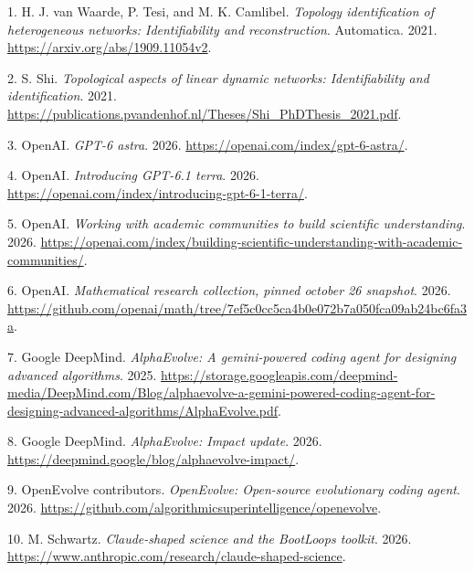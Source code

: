 \documentclass[
  11pt,
]{article}
\newlength{\cslhangindent}
\newlength{\cslentryspacingunit} %
\newenvironment{CSLReferences}[2] %
 {%
  \setlength{\parindent}{0pt}
  \ifodd #1
  \let\oldpar\par
  \def\par{\hangindent=\cslhangindent\oldpar}
  \fi
  \setlength{\parskip}{#2\cslentryspacingunit}
 }%
 {}
\begin{document}
\hypertarget{refs}{}
\begin{CSLReferences}{1}{1}
\leavevmode{}%
1. H. J. van Waarde, P. Tesi, and M. K. Camlibel. \emph{Topology
identification of heterogeneous networks: Identifiability and
reconstruction}. Automatica. 2021.
\url{https://arxiv.org/abs/1909.11054v2}.

\leavevmode{}%
2. S. Shi. \emph{Topological aspects of linear dynamic networks:
Identifiability and identification}. 2021.
\url{https://publications.pvandenhof.nl/Theses/Shi_PhDThesis_2021.pdf}.

\leavevmode{}%
3. OpenAI. \emph{GPT-6 astra}. 2026.
\url{https://openai.com/index/gpt-6-astra/}.

\leavevmode{}%
4. OpenAI. \emph{Introducing GPT-6.1 terra}. 2026.
\url{https://openai.com/index/introducing-gpt-6-1-terra/}.

\leavevmode{}%
5. OpenAI. \emph{Working with academic communities to build scientific
understanding}. 2026.
\url{https://openai.com/index/building-scientific-understanding-with-academic-communities/}.

\leavevmode{}%
6. OpenAI. \emph{Mathematical research collection, pinned october 26
snapshot}. 2026.
\url{https://github.com/openai/math/tree/7ef5c0cc5ca4b0e072b7a050fca09ab24bc6fa3a}.

\leavevmode{}%
7. Google DeepMind. \emph{AlphaEvolve: A gemini-powered coding agent for
designing advanced algorithms}. 2025.
\url{https://storage.googleapis.com/deepmind-media/DeepMind.com/Blog/alphaevolve-a-gemini-powered-coding-agent-for-designing-advanced-algorithms/AlphaEvolve.pdf}.

\leavevmode{}%
8. Google DeepMind. \emph{AlphaEvolve: Impact update}. 2026.
\url{https://deepmind.google/blog/alphaevolve-impact/}.

\leavevmode{}%
9. OpenEvolve contributors. \emph{OpenEvolve: Open-source evolutionary
coding agent}. 2026.
\url{https://github.com/algorithmicsuperintelligence/openevolve}.

\leavevmode{}%
10. M. Schwartz. \emph{Claude-shaped science and the BootLoops toolkit}.
2026. \url{https://www.anthropic.com/research/claude-shaped-science}.


\end{CSLReferences}
\end{document}
